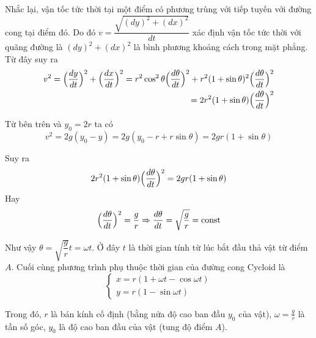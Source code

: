 \documentclass{mynotes}
\begin{document}
Nhắc lại, vận tốc tức thời tại một điểm có phương trùng với tiếp tuyến với đường cong tại điểm đó. Do đó $v = \dfrac{\sqrt{(dy)^2 + (dx)^2}}{dt}$ xác định vận tốc tức thời với quãng đường là $(dy)^2 + (dx)^2$ là bình phương khoảng cách trong mặt phẳng. Từ đây suy ra
\begin{align*}
    v^2 = \Bigl(\frac{dy}{dt}\Bigr)^2 + \Bigl(\frac{dx}{dt}\Bigr)^2 = r^2 \cos^2 \theta \Bigl( \frac{d \theta}{dt} \Bigr)^2 + r^2 (1 + \sin \theta)^2 \Bigl( \frac{d \theta}{dt} \Bigr)^2 \\ = 2 r^2 (1 + \sin \theta) \Bigl( \frac{d \theta}{dt} \Bigr)^2
\end{align*}

Từ bên trên và $y_0 = 2r$ ta có \[v^2 = 2 g (y_0 - y) = 2 g (y_0 - r + r \sin \theta) = 2 g r ( 1 + \sin \theta)\]

Suy ra
\begin{equation*}
    2 r^2 (1 + \sin \theta) \Bigl( \frac{d \theta}{dt} \Bigr)^2 = 2 g r (1 + \sin \theta)
\end{equation*}
Hay
\begin{equation}
    \Bigl(\frac{d \theta}{dt}\Bigr)^2 = \frac{g}{r} \Rightarrow \frac{d \theta}{dt} = \sqrt{\frac{g}{r}} = \text{const}
\end{equation}

Như vậy $\theta = \sqrt{\dfrac{g}{r}} t = \omega t$. Ở đây $t$ là thời gian tính từ lúc bắt đầu thả vật từ điểm $A$. Cuối cùng phương trình phụ thuộc thời gian của đường cong Cycloid là
\begin{equation}
    \begin{cases}
        x = r (1 + \omega t - \cos \omega t) \\ y = r (1 - \sin \omega t)
    \end{cases}
\end{equation}

Trong đó, $r$ là bán kính cố định (bằng nửa độ cao ban đầu $y_0$ của vật), $\omega = \frac{g}{r}$ là tần số góc, $y_0$ là độ cao ban đầu của vật (tung độ điểm $A$).


\end{document}
